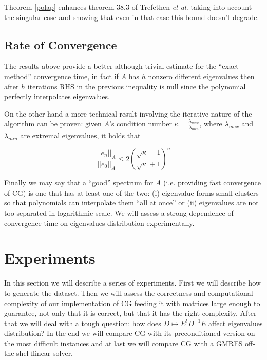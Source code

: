 \documentclass[12pt]{article}
\newcommand{\1}{\mathbbm{1}}
\begin{document}
 Theorem \ref{polap} enhances theorem 38.3 of Trefethen {\em et al.} \cite{trefethen97} taking into account the singular case and showing that even in that case this bound doesn't degrade.

\subsection{Rate of Convergence}
The results above provide a better although trivial estimate for the ``exact method'' convergence time, in fact if $A$ has $h$ nonzero different eigenvalues then after $h$ iterations RHS in the previous inequality is null since the polynomial perfectly interpolates eigenvalues.

On the other hand a more technical result involving the iterative nature of the algorithm can be proven: given $A$'s condition number $\kappa = \frac{\lambda_{max}}{\lambda_{min}}$, where $\lambda_{max}$ and $\lambda_{min}$ are extremal eigenvalues, it holds that

$$ \frac{||e_n||_A}{||e_0||_A} \leq 2 \left(\frac{\sqrt{\kappa} - 1}{\sqrt{\kappa} + 1}\right)^n $$

Finally we may say that a ``good'' spectrum for $A$ (i.e. providing fast convergence of CG) is one that has at least one of the two: (i) eigenvalue forms small clusters so that polynomials can interpolate them ``all at once'' or (ii) eigenvalues are not too separated in logarithmic scale. We will assess a strong dependence of convergence time on eigenvalues distribution experimentally. 


\section{Experiments}
In this section we will describe a series of experiments. First we will describe how to generate the dataset. Then we will assess the correctness  and computational complexity of our implementation of CG feeding it with matrices large enough to guarantee, not only that it is correct, but that it has the right complexity. After that we will deal with a tough question: how does $D \mapsto E^t D^{-1} E$ affect eigenvalues distribution? In the end we will compare CG with its preconditioned version on the most difficult instances and at last we will compare CG with a GMRES off-the-shel flinear solver.
\end{document}
